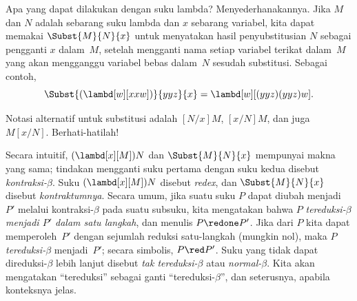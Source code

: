 \documentclass[../../../include/open-logic-section]{subfiles}
\begin{document}

Apa yang dapat dilakukan dengan suku lambda? Menyederhanakannya. Jika $M$ dan
$N$ adalah sebarang suku lambda dan $x$ sebarang variabel, kita dapat memakai
$\Subst{M}{N}{x}$ untuk menyatakan hasil penyubstitusian $N$ sebagai pengganti
$x$ dalam~$M$, setelah mengganti nama setiap variabel terikat dalam~$M$ yang
akan mengganggu variabel bebas dalam~$N$ sesudah substitusi. Sebagai contoh,
\[
\Subst{(\lambd[w][xxw])}{yyz}{x} = \lambd[w][(yyz)(yyz)w].
\]

\begin{digress}
Notasi alternatif untuk substitusi adalah $[N/x]M$, $[x/N]M$, dan juga
$M[x/N]$. Berhati-hatilah!
\end{digress}

Secara intuitif, $(\lambd[x][M])N$ dan $\Subst{M}{N}{x}$ mempunyai makna yang
sama; tindakan mengganti suku pertama dengan suku kedua disebut
\emph{kontraksi-$\beta$}. Suku $(\lambd[x][M])N$ disebut \emph{redex}, dan
$\Subst{M}{N}{x}$ disebut \emph{kontraktumnya}. Secara umum, jika suatu suku
$P$ dapat diubah menjadi~$P'$ melalui kontraksi-$\beta$ pada suatu subsuku,
kita mengatakan bahwa $P$ \emph{tereduksi-$\beta$ menjadi $P'$ dalam satu
langkah}, dan menulis $P \redone P'$. Jika dari $P$ kita dapat memperoleh~$P'$
dengan sejumlah reduksi satu-langkah (mungkin nol), maka $P$
\emph{tereduksi-$\beta$} menjadi~$P'$; secara simbolis, $P \red P'$. Suku yang
tidak dapat direduksi-$\beta$ lebih lanjut disebut \emph{tak tereduksi-$\beta$}
atau \emph{normal-$\beta$}. Kita akan mengatakan ``tereduksi'' sebagai ganti
``tereduksi-$\beta$'', dan seterusnya, apabila konteksnya jelas.
\end{document}
